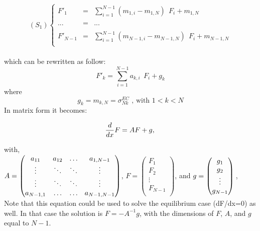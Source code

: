 \documentclass[a4paper,12pt]{article}
\begin{document}
$$(S_1)\left\lbrace
\begin{array}{lcl}
F'_1&=& \sum_{i=1}^{N-1} (m_{1,i} -   m_{1,N} ) \ \ F_i  +  m_{1,N}\\
 & & \\
... &=& ...\\
 & & \\
F'_{N-1} &=& \sum_{i=1}^{N-1} (m_{N-1,i}-m_{N-1,N}) \ \ F_i   +  m_{N-1,N}\\
\end{array}\right.$$
\\
which can be rewritten as follow:
\begin{equation}
 F'_{k} = \sum_{i=1}^{N-1} a_{k,i} \ \ F_i   +  g_k
 \label{eqM1}
\end{equation}
where 
$$g_k = m_{k,N} = \sigma_{Nk}^{EC}  \text{ , with } 1<k<N$$
In matrix form it becomes:


\begin{equation}
\frac{d}{dx}F=AF + g, \\
\label{eqM2}
\end{equation}

with, \\
$\\ A=\begin{pmatrix}
a_{11} & a_{12} & \ldots & a_{1,N-1} \\
\vdots & \ddots & \ddots & \vdots  \\
\vdots & \ddots & \ddots & \vdots  \\
a_{N-1,1} & \ldots & \ldots & a_{N-1,N-1}
\end{pmatrix}$,  $F=\begin{pmatrix}
 F_1 \\ 
 F_2 \\
 \vdots\\
 F_{N-1} \\ \end{pmatrix}$,  and $g=\begin{pmatrix}
 g_1 \\ 
 g_2 \\
 \vdots\\
 g_{N-1} \\ \end{pmatrix}\\$,\\
 
 Note that this equation could be used to solve the equilibrium case (dF/dx=0) as well. In that case the solution is $F= - A^{-1} g$, with the dimensions of $F$, $A$, and $g$ equal to $N-1$.
\end{document}
